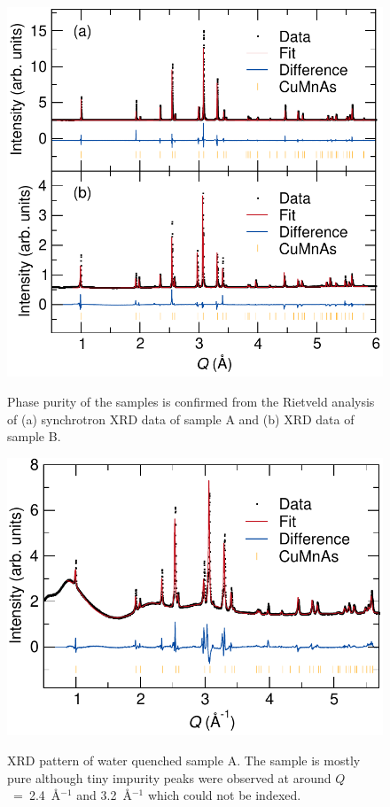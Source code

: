\documentclass[letterpaper,10pt,doublespacing,edeposit]{uiucthesis2020}
\begin{document}
\begin{mainmatter}
\begin{figure}[h]
\centering\includegraphics[width=0.7\columnwidth]{figures/ch7/suppl_XRD_data_cropped.pdf} \\
\caption{\label{fig:XRD_data}
Phase purity of the samples is confirmed from the Rietveld analysis of (a) synchrotron XRD data of sample A and (b) XRD data of sample B. %
} 
\end{figure}


\begin{figure}[h]
\centering\includegraphics[width=0.7\columnwidth]{figures/ch7/suppl_quenched_samples_A_cropped.pdf} \\
\caption{\label{fig:quenched_sample_A}
XRD pattern of water quenched sample A. The sample is mostly pure although tiny impurity peaks were observed at around $Q$~=~2.4~\AA$^{-1}$ and 3.2~\AA$^{-1}$ which could not be indexed.
} 
\end{figure}



\end{mainmatter}
\end{document}
